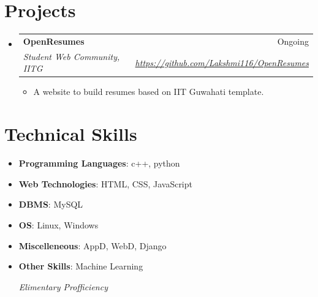 \documentclass[a4paper,10pt]{report}
\makeatletter
\newcommand{\resumeItem}[2]{
  \item\small{
    \textbf{#1}{: #2 \vspace{-2pt}}
  }
}
\newcommand{\resumeSubheading}[4]{
  \vspace{-1pt}\item
    \begin{tabular*}{0.97\textwidth}[t]{l@{\extracolsep{\fill}}r}
      \textbf{#1} & #2 \\
      \textit{\small#3} & \textit{\small #4} \\
    \end{tabular*}\vspace{-6pt}
}
\newcommand{\resumeSubItem}[2]{\resumeItem{#1}{#2}\vspace{-4pt}}
\newcommand{\resumeSubHeadingListStart}{\begin{itemize}[leftmargin=*]}
\newcommand{\resumeSubHeadingListEnd}{\end{itemize}}
\makeatother
\begin{document}
\vspace{4pt}


\section{Projects}
\resumeSubHeadingListStart

\resumeSubheading{OpenResumes}{Ongoing}{Student Web Community, IITG}{\href{https://github.com/Lakshmi116/OpenResumes}{\textit{\small https://github.com/Lakshmi116/OpenResumes   }}}
\begin{itemize}
\item A website to build resumes based on IIT Guwahati template.


 \end{itemize}
\vspace{2pt}

  
\resumeSubHeadingListEnd


\vspace{4pt}


\section{Technical Skills}

 \resumeSubHeadingListStart
 
\resumeSubItem{Programming Languages}{c++, python}
\resumeSubItem{Web Technologies}{HTML, CSS, JavaScript}
\resumeSubItem{DBMS}{MySQL}
\resumeSubItem{OS}{Linux, Windows}
\resumeSubItem{Miscelleneous}{AppD, WebD, Django}
\resumeSubItem{Other Skills}{Machine Learning}
 
 \hfill * \textit{Elimentary Profficiency}
 
 \resumeSubHeadingListEnd
 
 
 \vspace{1pt}
 
 
\end{document}
